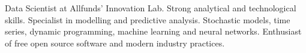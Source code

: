 

\begin{cvparagraph}

Data Scientist at Allfunds' Innovation Lab. Strong analytical and technological skills. Specialist in modelling and predictive analysis. Stochastic models, time series, dynamic programming, machine learning and neural networks. Enthusiast of free open source software and modern industry practices.
\end{cvparagraph}
